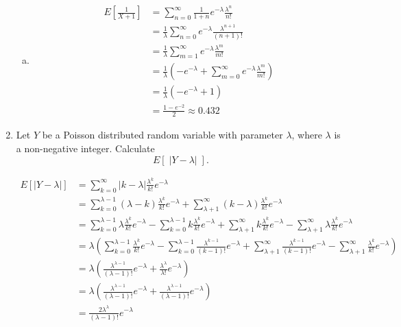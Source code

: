 \documentclass{article}
\begin{document}
\begin{enumerate}
\begin{enumerate}[a)]
\item

\begin{align*}
E\left[\frac{1}{X+1}\right] &= \sum_{n=0}^\infty \frac{1}{1+n}e^{-\lambda} \frac{\lambda^n}{n!} \\
&= \frac{1}{\lambda}\sum_{n=0}^\infty e^{-\lambda} \frac{\lambda^{n+1}}{(n+1)!} \\
&= \frac{1}{\lambda}\sum_{m=1}^\infty e^{-\lambda} \frac{\lambda^m}{m!} \\
&= \frac{1}{\lambda}\left(- e^{-\lambda} + \sum_{m=0}^\infty e^{-\lambda} \frac{\lambda^m}{m!} \right)\\
&= \frac{1}{\lambda}(-e^{-\lambda} + 1) \\
&= \boxed{\frac{1 - e^{-2}}{2} \approx 0.432}
\end{align*}

\end{enumerate}

\newpage
\item
Let $Y$ be a Poisson distributed random variable with parameter $\lambda$, where $\lambda$ is a non-negative integer. Calculate
\[
E\left[ \;\vert Y - \lambda \vert \;\right].
\]

\begin{align*}
E[|Y - \lambda |] &= \sum_{k=0}^\infty |k - \lambda| \frac{\lambda^k}{k!}e^{-\lambda} \\
&= \sum_{k=0}^{\lambda - 1} (\lambda-k) \frac{\lambda^k}{k!}e^{-\lambda} + \sum_{\lambda+1}^\infty (k - \lambda) \frac{\lambda^k}{k!}e^{-\lambda} \\
&= \sum_{k=0}^{\lambda - 1} \lambda \frac{\lambda^k}{k!}e^{-\lambda} - \sum_{k=0}^{\lambda - 1} k \frac{\lambda^k}{k!}e^{-\lambda} + 
\sum_{\lambda+1}^\infty k \frac{\lambda^k}{k!}e^{-\lambda} - 
\sum_{\lambda+1}^\infty \lambda\frac{\lambda^k}{k!}e^{-\lambda} \\
&= \lambda \left(
\sum_{k=0}^{\lambda - 1} \frac{\lambda^k}{k!}e^{-\lambda} - \sum_{k=0}^{\lambda - 1}  \frac{\lambda^{k-1}}{(k-1)!}e^{-\lambda} + 
\sum_{\lambda+1}^\infty \frac{\lambda^{k-1}}{(k-1)!}e^{-\lambda} - 
\sum_{\lambda+1}^\infty \frac{\lambda^k}{k!}e^{-\lambda}
\right) \\
&= \lambda \left(\frac{\lambda^{\lambda-1}}{(\lambda-1)!}e^{-\lambda} + \frac{\lambda^\lambda}{\lambda!}e^{-\lambda}\right)\\
&= \lambda \left(\frac{\lambda^{\lambda-1}}{(\lambda-1)!}e^{-\lambda} + \frac{\lambda^{\lambda-1}}{(\lambda-1)!}e^{-\lambda}\right) \\
&= \boxed{\frac{2\lambda^\lambda}{(\lambda-1)!}e^{-\lambda}}
\end{align*}

\end{enumerate}
\end{document}
